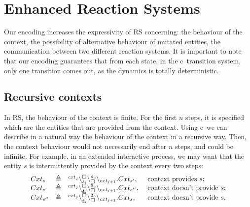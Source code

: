 
\section{Enhanced  Reaction Systems}
\label{sec:discussion}

Our encoding increases the expressivity of  RS  concerning:
the behaviour of the context, the possibility of alternative behaviour of
mutated entities, the communication between two different reaction systems.
It is important to note that our encoding guarantees that from each state, 
in the  c\CNA \ transition system, only one transition comes out, 
as the dynamics is totally deterministic.

\subsection{Recursive contexts}
In RS, the behaviour of the context is finite. For the first $n$ steps, it is specified 
 which are the entities that are provided from the context. 
Using c\CNA\ we can describe in a natural way the behaviour of the context in a recursive way. 
Then, the context behaviour would not necessarily end after $n$ steps,
and  could be infinite.
For example, in an extended interactive process, we may want that the entity $s$ is 
intermittently provided by the context every two steps: 
\[
\begin{array}{lcll}
Cxt_s & \triangleq &  {}^{cxt_j}\backslash_{\hat{s}_i}^{\scriptstyle {\square}}\backslash_{\scriptstyle {\square}}^{\hat{s}_o}\backslash_{cxt_{j+1}}.Cxt_{s'}, &\mbox{ context provides $s$;} \\
Cxt_{s'} & \triangleq & {}^{cxt_j}\backslash_{\underline{s}_i}^{\scriptstyle {\square}}\backslash_{\scriptstyle {\square}}^{\underline{s}_o}\backslash_{cxt_{j+1}}.Cxt_{s''},& \mbox{ context doesn't provide $s$;} \\
Cxt_{s''} & \triangleq & {}^{cxt_j}\backslash_{\underline{s}_i}^{\scriptstyle {\square}}\backslash_{\scriptstyle {\square}}^{\underline{s}_o}\backslash_{cxt_{j+1}}.Cxt_{s}, & \mbox{ context doesn't provide $s$.} \\
\end{array}
\]

